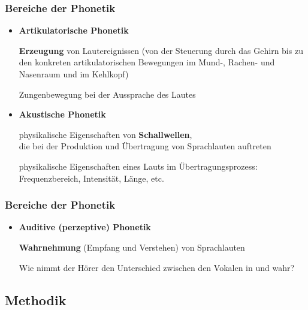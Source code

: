 \begin{frame}
\frametitle{Bereiche der Phonetik}

	\begin{itemize}
		\item \textbf{Artikulatorische Phonetik}
		
\textbf{Erzeugung} von Lautereignissen (von der Steuerung durch das Gehirn bis zu den konkreten artikulatorischen Bewegungen im Mund-, Rachen- und Nasenraum und im Kehlkopf)

			\ea Zungenbewegung bei der Aussprache des Lautes \textipa{[ \texttoptiebar{tS} ]}
			\z

\pause 
		
		\item \textbf{Akustische Phonetik}
		
                       physikalische Eigenschaften von \textbf{Schallwellen},\\
                       die bei der Produktion und Übertragung von Sprachlauten auftreten

			\ea physikalische Eigenschaften eines Lauts im Übertragungsprozess: Frequenzbereich, Intensität, Länge, etc.
			\z

	\end{itemize}

\end{frame}


\begin{frame}
\frametitle{Bereiche der Phonetik}

\begin{itemize}

			
		\item \textbf{Auditive (perzeptive) Phonetik}
		
		      \textbf{Wahrnehmung} (Empfang und Verstehen) von Sprachlauten

			\ea Wie nimmt der Hörer den Unterschied zwischen den Vokalen in  und  wahr?
			\z
		
	\end{itemize}
	
\end{frame}


\subsection{Methodik}

